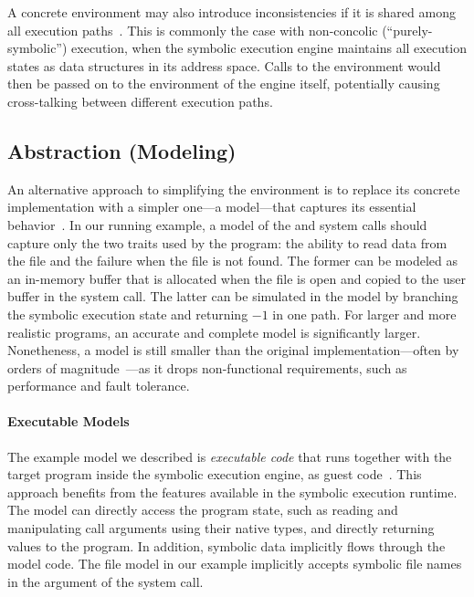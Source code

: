 A concrete environment may also introduce inconsistencies if it is shared among all execution paths~\cite{klee}.
%
This is commonly the case with non-concolic (``purely-symbolic'') execution, when the symbolic execution engine maintains all execution states as data structures in its address space.  Calls to the environment would then be passed on to the environment of the engine itself, potentially causing cross-talking between different execution paths.

\subsection{Abstraction (Modeling)}

An alternative approach to simplifying the environment is to replace its concrete implementation with a simpler one---a model---that captures its essential behavior~\cite{klee,mayhem,aeg}.
%
In our running example, a model of the  and  system calls should capture only the two traits used by the program: the ability to read data from the file and the failure when the file is not found.
%
The former can be modeled as an in-memory buffer that is allocated when the file is open and copied to the user buffer in the  system call.
%
The latter can be simulated in the model by branching the symbolic execution state and returning $-1$ in one path.
%
For larger and more realistic programs, an accurate and complete model is significantly larger.  Nonetheness, a model is still smaller than the original implementation---often by orders of magnitude~\cite{klee}---as it drops non-functional requirements, such as performance and fault tolerance.

\paragraph{Executable Models}

The example model we described is \emph{executable code} that runs together with the target program inside the symbolic execution engine, as guest code~\cite{klee}.
%
This approach benefits from the features available in the symbolic execution runtime.  The model can directly access the program state, such as reading and manipulating call arguments using their native types, and directly returning values to the program.
%
In addition, symbolic data implicitly flows through the model code.  The file model in our example implicitly accepts symbolic file names in the  argument of the  system call.

